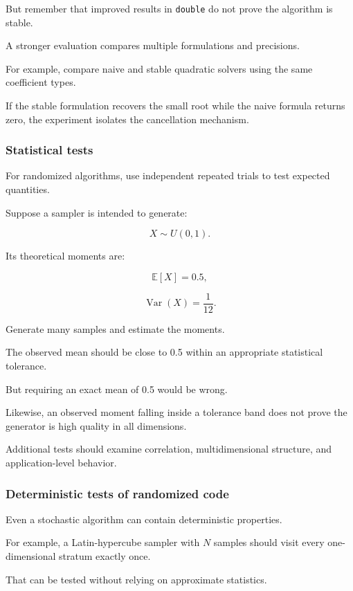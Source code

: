 But remember that improved results in \texttt{double} do not prove the algorithm is stable.

A stronger evaluation compares multiple formulations and precisions.

For example, compare naive and stable quadratic solvers using the same coefficient types.

If the stable formulation recovers the small root while the naive formula returns zero, the experiment isolates the cancellation mechanism.

\subsubsection{Statistical tests}\label{02-foundations-ii-ch031-statistical-tests}

For randomized algorithms, use independent repeated trials to test expected quantities.

Suppose a sampler is intended to generate:

\[ X\sim U(0,1). \]

Its theoretical moments are:

\[ \mathbb E[X]=0.5, \]

\[ \operatorname{Var}(X)=\frac1{12}. \]

Generate many samples and estimate the moments.

The observed mean should be close to 0.5 within an appropriate statistical tolerance.

But requiring an exact mean of 0.5 would be wrong.

Likewise, an observed moment falling inside a tolerance band does not prove the generator is high quality in all dimensions.

Additional tests should examine correlation, multidimensional structure, and application-level behavior.

\subsubsection{Deterministic tests of randomized code}\label{02-foundations-ii-ch031-deterministic-tests-of-randomized-code}

Even a stochastic algorithm can contain deterministic properties.

For example, a Latin-hypercube sampler with \(N\) samples should visit every one-dimensional stratum exactly once.

That can be tested without relying on approximate statistics.

